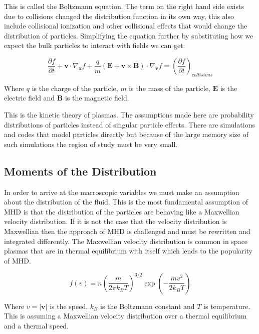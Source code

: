 \documentclass[12pt,upcase]{umlthesis}
\begin{document}
This is called the Boltzmann equation. The term on the right hand side exists due to collisions changed the distribution function in its own way, this also include collisional ionization and other collisional effects that would change the distribution of particles. Simplifying the equation further by substituting how we expect the bulk particles to interact with fields we can get:

\begin{equation}
	\frac{\partial f}{\partial t} + \textbf{v} \cdot \nabla_{\textbf{x}} f + \frac{q}{m} (\textbf{E} + \textbf{v} \times \textbf{B}) \cdot \nabla_{\textbf{v}} f = {(\frac{\partial f}{\partial t})}_{collisions}
\end{equation}

Where $q$ is the charge of the particle, $m$ is the mass of the particle, $\textbf{E}$ is the electric field and $\textbf{B}$ is the magnetic field.

This is the kinetic theory of plasmas. The assumptions made here are probability distributions of particles instead of singular particle effects. There are simulations and codes that model particles directly but because of the large memory size of such simulations the region of study must be very small. 

\subsection{Moments of the Distribution}\label{sec:moments}

In order to arrive at the macroscopic variables we must make an assumption about the distribution of the fluid. This is the most fundamental assumption of MHD is that the distribution of the particles are behaving like a Maxwellian velocity distribution. If it is not the case that the velocity distribution is Maxwellian then the approach of MHD is challenged and must be rewritten and integrated differently. The Maxwellian velocity distribution is common in space plasmas that are in thermal equilibrium with itself which lends to the popularity of MHD\@.

\begin{equation}
	f(v) = n {(\frac{m}{2\pi k_B T})}^{3/2} \exp{(-\frac{mv^2}{2k_B T})}
\end{equation}

Where $v = |\textbf{v}|$ is the speed, $k_B$ is the Boltzmann constant and $T$ is temperature. This is assuming a Maxwellian velocity distribution over a thermal equilibrium and a thermal speed.
\end{document}
